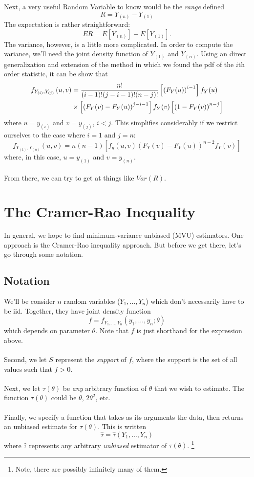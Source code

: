 \documentclass[a4paper,12pt]{scrartcl}
\begin{document}
Next, a very useful Random Variable to know would be the \emph{range}
defined
   \[ R = Y_{(n)} - Y_{(1)}\]
The expectation is rather straightforward:
   \[ ER = E\left[Y_{(n)}\right] - E\left[Y_{(1)}\right].\]
The variance, however, is a little more complicated.  In order to
compute the variance, we'll need the joint density function of
$Y_{(1)}$ and $Y_{(n)}$.
Using an direct generalization and extension of the method in which
we found the pdf of the $i$th order statistic, it can be show that
\begin{align}
   f_{Y_{(i)}, Y_{(j)}}\left(u, v\right)
   &= \frac{n!}{(i-1)!(j-i-1)!(n-j)!}
   \left[\left(F_Y(u)\right)^{i-1}\right] f_Y(u)
   \notag \\
   &\times\left[\left(F_Y(v) - F_Y(u)\right)^{j-i-1}\right]
   f_Y(v) \left[\left(1-F_Y(v)\right)^{n-j}\right]
\end{align}
where $u = y_{(i)}$ and $v = y_{(j)}$, $i<j$.
This simplifies considerably if we restrict ourselves to the case where
$i=1$ and $j=n$:
   \[ f_{Y_{(1)}, Y_{(n)}}\left(u, v\right) =
      n(n-1) \left[ f_y( u, v) \left( F_Y(v) - F_Y(u)\right)^{n-2}
	 f_Y(v)\right] \]
where, in this case, $u = y_{(1)}$ and $v = y_{(n)}$.
\\
\\
From there, we can try to get at things like $Var(R)$.


\newpage


\section{The Cramer-Rao Inequality}

In general, we hope to find minimum-variance unbiased (MVU)
estimators. One approach is the Cramer-Rao inequality approach. But
before we get there, let's go through some notation.

\subsection{Notation}

We'll be consider $n$ random variables ($Y_1, \ldots, Y_n$) which
don't necessarily have to be iid. Together, they have joint density
function
   \[ f = f_{Y_1, \ldots, Y_n}(y_1, \ldots, y_n; \theta) \]
which depends on parameter $\theta$. Note that $f$ is just shorthand
for the expression above.
\\
\\
Second, we let $S$ represent the \emph{support} of $f$, where the
support is the set of all values such that $f > 0$.
\\
\\
Next, we let $\tau(\theta)$ be \emph{any} arbitrary function of $\theta$
that we wish to estimate. The function $\tau(\theta)$ could be
$\theta$, $2\theta^2$, etc.
\\
\\
Finally, we specify a function that takes as its arguments the
data, then returns an unbiased estimate for $\tau(\theta)$.
This is written
   \[\hat{\tau} =  \hat{\tau}(Y_1, \ldots, Y_n) \]
where $\hat{\tau}$ represents any arbitrary \emph{unbiased} estimator of
$\tau(\theta)$. \footnote{Note, there are possibly infinitely many of
them.}
\end{document}
